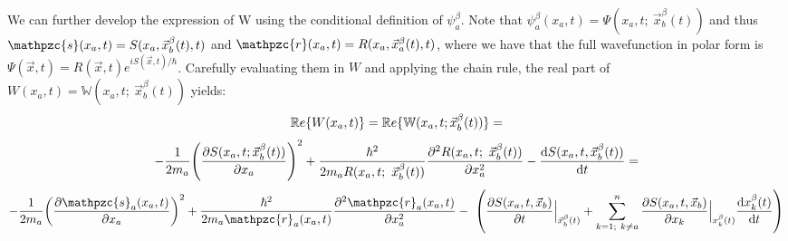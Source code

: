 \documentclass[11pt, a4paper]{article} %
\newcommand{\R}{\mathbb{R}} %
\newcommand{\z}{\mathpzc{s}}
\newcommand{\p}{\mathpzc{r}}
\newcommand{\W}{\mathbb{W}}
\begin{document}
We can further develop the expression of W using the conditional definition of $\psi_a^\beta$. Note that $\psi_a^\beta ( x_a, t) = \Psi(x_a,t; \ \vec{x}_b^\beta(t))$ and thus $\z(x_a,t)=S(x_a, \vec{x}_b^\beta(t),t)$ and $\p (x_a,t)=R(x_a, \vec{x}_a^\beta (t),t)$, where we have that the full wavefunction in polar form is $\Psi(\vec{x},t)=R(\vec{x},t)e^{iS(\vec{x},t)/\hbar}$. Carefully evaluating them in $W$ and applying the chain rule, the real part of $W(x_a,t)=\W(x_a,t;\ \vec{x}_b^\beta(t))$ yields:
$$
\R e\{W(x_a,t)\}=\R e\{\W(x_a,t; \vec{x}_b^\beta(t))\}=\vspace{-0.12cm}
$$
$$
-\frac{1}{2m_a} \qty(\pdv{S(x_a,t;\vec{x}_b^\beta(t))}{x_a})^2 +\frac{\hbar^2}{2m_aR(x_a,t;\ \vec{x}_b^\beta(t))}\pdv[2]{R(x_a, t; \ \vec{x}_b^\beta(t))}{x_a}-\dv{S(x_a,t,\vec{x}_b^\beta(t))}{t}=\vspace{-0.1cm}
$$
$$
-\frac{1}{2m_a} \qty(\pdv{\z_a(x_a,t)}{x_a})^2 +\frac{\hbar^2}{2m_a\p_a(x_a,t)}\pdv[2]{\p_a(x_a, t)}{x_a}- \ \qty(\pdv{S(x_a,t,\vec{x}_b)}{t}\Big\rvert_{\vec{x}_b^\beta(t)}+\sum_{k=1;\ k\neq a}^n \pdv{S(x_a,t,\vec{x}_b)}{x_k}\Big\rvert_{x_k^\beta(t)} \dv{x_k^\beta(t)}{t})\vspace{-0.12cm}
$$
\end{document}
